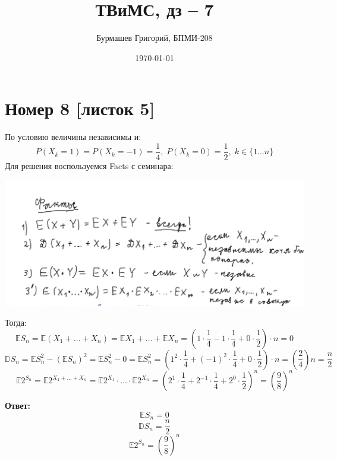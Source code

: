\documentclass[a4paper,12pt]{article}
\author{Бурмашев Григорий, БПМИ-208}
\title{ТВиМС, дз -- 7}
\date{\today}
\begin{document}
\maketitle
\clearpage
\section*{Номер 8 [листок 5]}
По условию величины независимы и:
\[
P(X_k = 1) = P(X_k = -1) = \frac14, \; P(X_k = 0) = \frac12, \; k \in \{1 \ldots n\}
\]
Для решения воспользуемся Facts с семинара:
\begin{center}
\includegraphics[scale=0.3]{1.png}
\end{center}
Тогда:
\[
\mathbb{E}S_n = \mathbb{E}(X_1 + \ldots + X_n) = \mathbb{E}X_1 + \ldots + \mathbb{E}X_n = \left(1 \cdot \frac14 - 1 \cdot \frac14 + 0 \cdot \frac12\right) \cdot n = 0
\]
\[
\mathbb{D}S_n =  \mathbb{E}S_n^2 - (\mathbb{E}S_n)^2 =  \mathbb{E}S_n^2 - 0 = \mathbb{E}S_n^2 = \left(1^2 \cdot \frac{1}{4} + (-1)^2 \cdot \frac14 + 0 \cdot \frac12 \right) \cdot n = \left(\frac24\right)n = \frac{n}{2} 
\]
\[
\mathbb{E}2^{S_n} = \mathbb{E}2^{X_1 + \ldots +X_n} = \mathbb{E}2^{X_1} \cdot \ldots \cdot \mathbb{E}2^{X_n} = \left(2^1 \cdot \frac14 + 2^{-1} \cdot \frac14 + 2^0 \cdot \frac{1}{2}\right)^n =\left( \frac{9}{8} \right)^n
\]
\begin{center}
\textbf{Ответ: } \[
\mathbb{E}S_n = 0
\]
\[
\mathbb{D}S_n = \frac{n}{2}
\]
\[
\mathbb{E}2^{S_n} = \left( \frac{9}{8} \right)^n
\]
\end{center}
\clearpage
\end{document}
